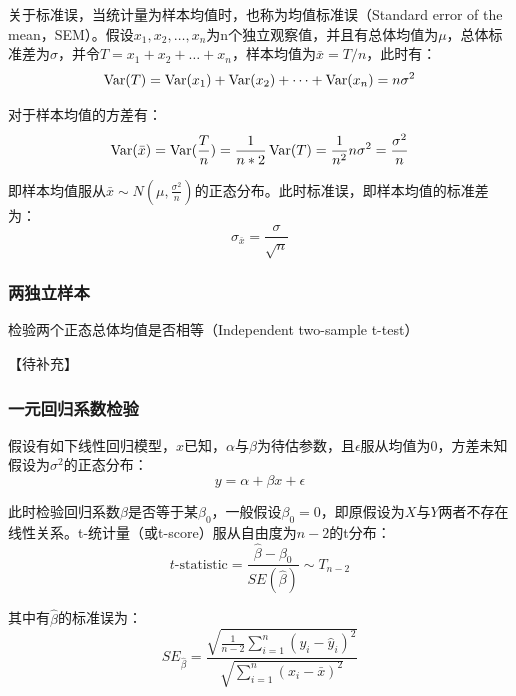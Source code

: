 \documentclass[11pt]{article}
\begin{document}
\begin{remark}
    关于标准误，当统计量为样本均值时，也称为均值标准误（Standard error of the mean，SEM）。假设$x_1,x_2,\dots,x_n$为n个独立观察值，并且有总体均值为$\mu$，总体标准差为$\sigma$，并令$T = x_1 + x_2 + \dots + x_n$，样本均值为$\bar{x} = T/n$，此时有：
    \begin{equation*}
        \operatorname{Var}(T) = \operatorname{Var}(x_1) + \operatorname{Var}(x_2) + \dots + \operatorname{Var}(x_n) = n \sigma^2
    \end{equation*}
    
    对于样本均值的方差有：
    \begin{equation*}
        \operatorname{Var}(\bar{x}) = \operatorname{Var}(\frac{T}{n}) = \frac{1}{n*2} \operatorname{Var}(T) = \frac{1}{n^2} n\sigma^2 = \frac{\sigma^2}{n}
    \end{equation*}

    即样本均值服从$\bar{x}\sim N(\mu,\frac{\sigma^2}{n})$的正态分布。此时标准误，即样本均值的标准差为：
    \begin{equation*}
        \sigma_{\bar{x}} = \frac{\sigma}{\sqrt{n}}
    \end{equation*}
\end{remark}

\subsubsection{两独立样本}

检验两个正态总体均值是否相等（Independent two-sample t-test）

【待补充】

\subsubsection{一元回归系数检验}

假设有如下线性回归模型，$x$已知，$\alpha$与$\beta$为待估参数，且$\epsilon$服从均值为0，方差未知假设为$\sigma^2$的正态分布：
\begin{equation*}
    y = \alpha + \beta x + \epsilon
\end{equation*}

此时检验回归系数$\beta$是否等于某$\beta_0$，一般假设$\beta_0 = 0$，即原假设为$X$与$Y$两者不存在线性关系。t-统计量（或t-score）服从自由度为$n-2$的t分布：
\begin{equation*}
    t\text{-statistic} = \frac{\hat{\beta} - \beta_0}{SE(\hat{\beta})} \sim T_{n-2}
\end{equation*}

其中有$\hat{\beta}$的标准误为：
\begin{equation*}
    SE_{\hat{\beta}} = \frac{\sqrt{\frac{1}{n-2} \sum_{i=1}^{n} (y_i - \hat{y}_i)^2}}{\sqrt{\sum_{i=1}^{n} (x_i - \bar{x})^2}}
\end{equation*}
\end{document}
